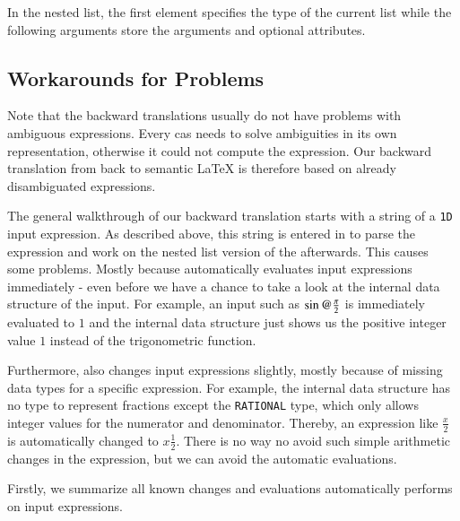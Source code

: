 In the nested list, the first element specifies the type of the current list while the following arguments store the arguments and optional attributes.

\subsection{Workarounds for Problems}\label{subsec:maple-probs}
Note that the backward translations usually do not have problems with ambiguous expressions. Every \gls{cas} needs to solve ambiguities in its own representation, otherwise it could not compute the expression. Our backward translation from \Maple{} back to semantic \LaTeX{} is therefore based on already disambiguated expressions.

The general walkthrough of our backward translation starts with a string of a \texttt{1D} \Maple{} input expression. As described above, this string is entered in \Maple{} to parse the expression and work on the nested list version of the \inertF{} afterwards. This causes some problems. Mostly because \Maple{} automatically evaluates input expressions immediately - even before we have a chance to take a look at the internal data structure of the input. For example, an input such as $\sin@{\frac{\cpi}{2}}$ is immediately evaluated to $1$ and the internal data structure just shows us the positive integer value $1$ instead of the trigonometric function.

Furthermore, \Maple{} also changes input expressions slightly, mostly because of missing data types for a specific expression. For example, the internal data structure has no type to represent fractions except the \texttt{RATIONAL} type, which only allows integer values for the numerator and denominator. Thereby, an expression like $\frac{x}{2}$ is automatically changed to $x\frac{1}{2}$. There is no way no avoid such simple arithmetic changes in the expression, but we can avoid the automatic evaluations.

Firstly, we summarize all known changes and evaluations \Maple{} automatically performs on input expressions.

